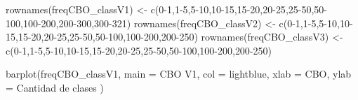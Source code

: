 \documentclass[
]{article}
\newenvironment{Shaded}{\begin{snugshade}}{\end{snugshade}}
\newcommand{\AttributeTok}[1]{\textcolor[rgb]{0.77,0.63,0.00}{#1}}
\newcommand{\FunctionTok}[1]{\textcolor[rgb]{0.00,0.00,0.00}{#1}}
\newcommand{\NormalTok}[1]{#1}
\newcommand{\OtherTok}[1]{\textcolor[rgb]{0.56,0.35,0.01}{#1}}
\newcommand{\StringTok}[1]{\textcolor[rgb]{0.31,0.60,0.02}{#1}}
\begin{document}
\begin{Shaded}
\begin{Highlighting}[]
\FunctionTok{rownames}\NormalTok{(freqCBO\_classV1) }\OtherTok{\textless{}{-}} \FunctionTok{c}\NormalTok{(}\StringTok{\textquotesingle{}0{-}1\textquotesingle{}}\NormalTok{,}\StringTok{\textquotesingle{}1{-}5\textquotesingle{}}\NormalTok{,}\StringTok{\textquotesingle{}5{-}10\textquotesingle{}}\NormalTok{,}\StringTok{\textquotesingle{}10{-}15\textquotesingle{}}\NormalTok{,}\StringTok{\textquotesingle{}15{-}20\textquotesingle{}}\NormalTok{,}\StringTok{\textquotesingle{}20{-}25\textquotesingle{}}\NormalTok{,}\StringTok{\textquotesingle{}25{-}50\textquotesingle{}}\NormalTok{,}\StringTok{\textquotesingle{}50{-}100\textquotesingle{}}\NormalTok{,}\StringTok{\textquotesingle{}100{-}200\textquotesingle{}}\NormalTok{,}\StringTok{\textquotesingle{}200{-}300\textquotesingle{}}\NormalTok{,}\StringTok{\textquotesingle{}300{-}321\textquotesingle{}}\NormalTok{)}
\FunctionTok{rownames}\NormalTok{(freqCBO\_classV2) }\OtherTok{\textless{}{-}} \FunctionTok{c}\NormalTok{(}\StringTok{\textquotesingle{}0{-}1\textquotesingle{}}\NormalTok{,}\StringTok{\textquotesingle{}1{-}5\textquotesingle{}}\NormalTok{,}\StringTok{\textquotesingle{}5{-}10\textquotesingle{}}\NormalTok{,}\StringTok{\textquotesingle{}10{-}15\textquotesingle{}}\NormalTok{,}\StringTok{\textquotesingle{}15{-}20\textquotesingle{}}\NormalTok{,}\StringTok{\textquotesingle{}20{-}25\textquotesingle{}}\NormalTok{,}\StringTok{\textquotesingle{}25{-}50\textquotesingle{}}\NormalTok{,}\StringTok{\textquotesingle{}50{-}100\textquotesingle{}}\NormalTok{,}\StringTok{\textquotesingle{}100{-}200\textquotesingle{}}\NormalTok{,}\StringTok{\textquotesingle{}200{-}250\textquotesingle{}}\NormalTok{)}
\FunctionTok{rownames}\NormalTok{(freqCBO\_classV3) }\OtherTok{\textless{}{-}} \FunctionTok{c}\NormalTok{(}\StringTok{\textquotesingle{}0{-}1\textquotesingle{}}\NormalTok{,}\StringTok{\textquotesingle{}1{-}5\textquotesingle{}}\NormalTok{,}\StringTok{\textquotesingle{}5{-}10\textquotesingle{}}\NormalTok{,}\StringTok{\textquotesingle{}10{-}15\textquotesingle{}}\NormalTok{,}\StringTok{\textquotesingle{}15{-}20\textquotesingle{}}\NormalTok{,}\StringTok{\textquotesingle{}20{-}25\textquotesingle{}}\NormalTok{,}\StringTok{\textquotesingle{}25{-}50\textquotesingle{}}\NormalTok{,}\StringTok{\textquotesingle{}50{-}100\textquotesingle{}}\NormalTok{,}\StringTok{\textquotesingle{}100{-}200\textquotesingle{}}\NormalTok{,}\StringTok{\textquotesingle{}200{-}250\textquotesingle{}}\NormalTok{)}

\FunctionTok{barplot}\NormalTok{(freqCBO\_classV1,}
        \AttributeTok{main =} \StringTok{\textquotesingle{}CBO V1\textquotesingle{}}\NormalTok{,}
        \AttributeTok{col =} \StringTok{\textquotesingle{}lightblue\textquotesingle{}}\NormalTok{,}
        \AttributeTok{xlab =} \StringTok{\textquotesingle{}CBO\textquotesingle{}}\NormalTok{,}
        \AttributeTok{ylab =} \StringTok{\textquotesingle{}Cantidad de clases \textquotesingle{}}\NormalTok{)}
\end{Highlighting}
\end{Shaded}
\end{document}
